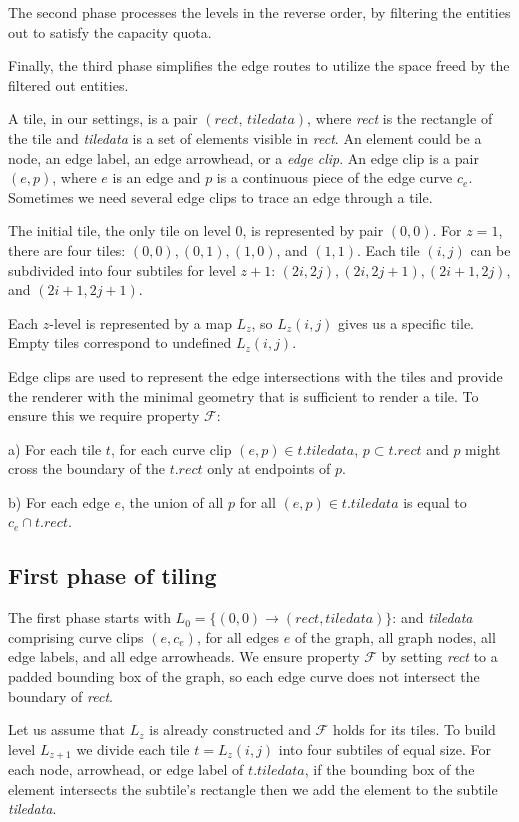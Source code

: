 \documentclass{gd-llncs}
\begin{document}
{The second phase processes the levels in the reverse order, by filtering the entities out to satisfy the capacity quota. 

Finally, the third phase simplifies the edge routes to utilize the space freed by the filtered out entities.


A tile, in our settings, is a pair $(\textit{rect, tiledata})$, where \textit{rect} is the rectangle of the tile and \textit{tiledata} is a set of elements visible in \textit{rect}. An  element could be a node, an edge label, an edge arrowhead, or a \textit{edge clip}. An edge clip is a pair $(e, p)$, where $e$ is an edge and $p$ is a continuous piece of the edge curve $c_e$. Sometimes we need several edge clips to trace an edge through a tile. 


The initial tile, the only tile on level $0$, is represented by pair $(0,0)$. For $z = 1$, there are four tiles: $(0,0),(0,1),(1,0)$, and $(1,1)$. Each tile $(i,j)$ can be subdivided into four subtiles for level $z+1$: $(2i,2j),(2i,2j+1), (2i+1,2j)$, and $(2i+1,2j+1)$.

Each $z$-level is represented by a map $L_z$, so $L_z(i, j)$ gives us a specific tile. Empty tiles correspond to undefined $L_z(i, j)$.

Edge clips are used to represent the edge intersections with the tiles and provide the renderer with the minimal geometry that is sufficient to render a tile. To ensure this we require property $\mathcal{F}$: 

a) For each tile $t$, for each curve clip $(e,p) \in t.\textit{tiledata}$, $p \subset t.rect$ and $p$ might cross the boundary of the $t.rect$ only at endpoints of $p$.

b) For each edge $e$, the union of all $p$ for all $(e,p) \in t.\textit{tiledata}$ is equal to $c_e \cap t.rect$.

\subsection*{First phase of tiling}

The first phase starts with $L_0 = \{(0,0) \rightarrow (\textit{rect},\textit{tiledata})\}$: and \textit{tiledata} comprising curve clips $(e,c_e)$, for all edges $e$ of the graph, all graph nodes, all edge labels, and all edge arrowheads. We ensure property $\mathcal{F}$ by setting \textit{rect} to a padded bounding box of the graph, so each edge curve does not intersect the boundary of \textit{rect}.

Let us assume that $L_z$ is already constructed and $\mathcal{F}$ holds for its tiles. To build level $L_{z+1}$ we divide each tile $t=L_z(i, j)$ into four subtiles of equal size. For each node, arrowhead, or edge label of $t.\textit{tiledata}$, if the bounding box of the element intersects the subtile's rectangle then we add the element to the subtile \textit{tiledata}.

}
\end{document}
